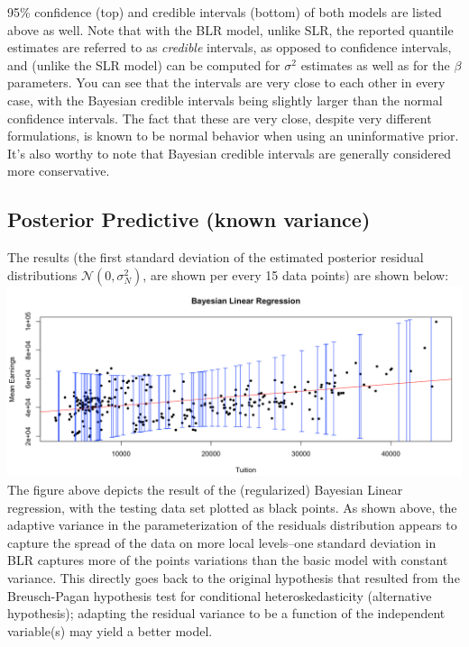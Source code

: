 \documentclass[10pt]{article}
\begin{document}
95\% confidence (top) and credible intervals (bottom) of both models are listed above as well. Note that with the BLR model, unlike SLR, the reported quantile estimates are referred to as {\it credible} intervals, as opposed to confidence intervals, and (unlike the SLR model) can be computed for $\sigma^2$ estimates as well as for the $\beta$ parameters. You can see that the intervals are very close to each other in every case, with the Bayesian credible intervals being slightly larger than the normal confidence intervals. The fact that these are very close, despite very different formulations, is known to be normal behavior when using an uninformative prior\cite{murphy2012machine}. It's also worthy to note that Bayesian credible intervals are generally considered more conservative\cite{curran2005introduction}.  

\subsection{Posterior Predictive (known variance)}
The results (the first standard deviation of the estimated posterior residual distributions $\mathcal{N}(0, \sigma_N^2)$, are shown per every 15 data points) are shown below: 
\includegraphics[width=\textwidth]{figures/blr}
The figure above depicts the result of the (regularized) Bayesian Linear regression, with the testing data set plotted as black points. As shown above, the adaptive variance in the parameterization of the residuals distribution appears to capture the spread of the data on more local levels--one standard deviation in BLR captures more of the points variations than the basic model with constant variance. This directly goes back to the original hypothesis that resulted from the Breusch-Pagan hypothesis test for conditional heteroskedasticity (alternative hypothesis); adapting the residual variance to be a function of the independent variable(s) may yield a better model. 
\end{document}
